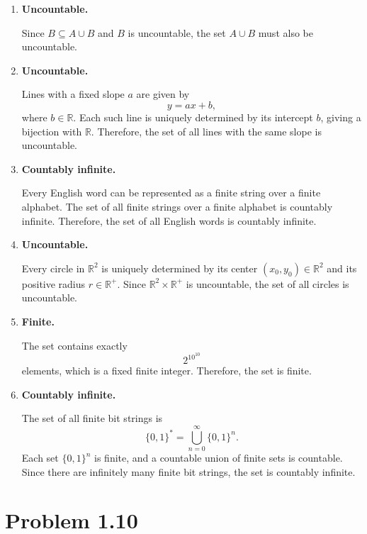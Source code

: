 \documentclass[12pt]{article}
\begin{document}
\begin{enumerate}[label=\alph*)]
    \item \textbf{Uncountable.}
    
    Since $B \subseteq A \cup B$ and $B$ is uncountable, the set
    $A \cup B$ must also be uncountable.

    \item \textbf{Uncountable.}
    
    Lines with a fixed slope $a$ are given by
    \[
    y = ax + b,
    \]
    where $b \in \mathbb{R}$. Each such line is uniquely determined by
    its intercept $b$, giving a bijection with $\mathbb{R}$. Therefore,
    the set of all lines with the same slope is uncountable.

    \item \textbf{Countably infinite.}
    
    Every English word can be represented as a finite string over a
    finite alphabet. The set of all finite strings over a finite alphabet
    is countably infinite. Therefore, the set of all English words is
    countably infinite.

    \item \textbf{Uncountable.}
    
    Every circle in $\mathbb{R}^2$ is uniquely determined by its center
    $(x_0,y_0) \in \mathbb{R}^2$ and its positive radius $r \in \mathbb{R}^+$.
    Since $\mathbb{R}^2 \times \mathbb{R}^+$ is uncountable, the set of
    all circles is uncountable.

    \item \textbf{Finite.}
    
    The set contains exactly
    \[
    2^{10^{10}}
    \]
    elements, which is a fixed finite integer. Therefore, the set is
    finite.

    \item \textbf{Countably infinite.}
    
    The set of all finite bit strings is
    \[
    \{0,1\}^* = \bigcup_{n=0}^{\infty} \{0,1\}^n.
    \]
    Each set $\{0,1\}^n$ is finite, and a countable union of finite sets
    is countable. Since there are infinitely many finite bit strings,
    the set is countably infinite.

\end{enumerate}


\section*{Problem 1.10}
\end{document}
